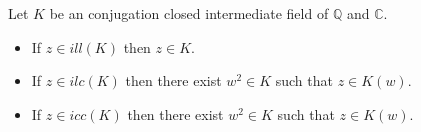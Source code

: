 \begin{frame}
    \begin{theorem}
        Let $K$ be an conjugation closed intermediate field of $\mathbb{Q}$ and $\mathbb{C}$.
        \begin{itemize}
            \item If $z\in ill(K)$ then $z\in K$.
            \item If $z\in ilc(K)$ then there exist $w^2 \in K$ such that $z\in K(w)$.
            \item If $z\in icc(K)$ then there exist $w^2 \in K$ such that $z\in K(w)$.
        \end{itemize}
    \end{theorem}
\end{frame}

